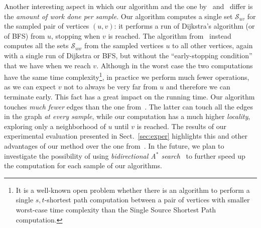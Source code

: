 Another interesting aspect in which our algorithm and the one
by~\citet{JacobKLPT05} and~\citet{BrandesP07} differ is the \emph{amount of work
done per sample}. Our algorithm computes a single set $\mathcal{S}_{uv}$ for the
sampled pair of vertices $(u,v)$: it performs a run of Dijkstra's algorithm (or of
BFS) from $u$, stopping when $v$ is reached. The algorithm
from~\citep{JacobKLPT05,BrandesP07} instead computes
all the sets $\mathcal{S}_{uw}$ from the sampled vertices $u$ to all other
vertices, again with a single run of Dijkstra or BFS, but without the
``early-stopping condition'' that we have when we reach $v$. Although in the
worst case the two computations have the same time complexity\footnote{It is a
well-known open problem whether there is an algorithm to perform a single
$s,t$-shortest path computation between a pair of vertices with smaller
worst-case time complexity than the Single Source Shortest Path computation.}, in practice we
perform much fewer operations, as we can expect $v$ not to always be very
far from $u$ and therefore we can terminate early. This fact has a great
impact on the running time. Our algorithm touches
\emph{much fewer} edges than the one from~\citep{JacobKLPT05,BrandesP07}.
The latter can touch all the edges in the graph \emph{at every sample}, while
our computation has a much higher \emph{locality}, exploring only a neighborhood
of $u$ until $v$ is reached. The results of our experimental evaluation
presented in Sect.~\ref{sec:exper} highlights this and other advantages of our
method over the one from~\citep{JacobKLPT05,BrandesP07}. In the future, we plan
to investigate the possibility of using \emph{bidirectional A$^*$
search}~\citep{Pohl69,KaindlK97} to further speed up the computation for each
sample of our algorithms.


